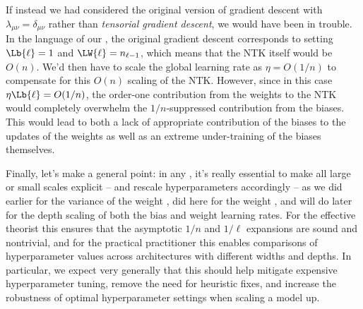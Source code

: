 If instead we 
had
considered the original version of gradient descent with $\lambda_{\mu\nu} = \delta_{\mu\nu}$ rather than \emph{tensorial gradient descent}, 
we would have been in trouble. In the language of our , the original gradient descent corresponds to setting $\Lb{\ell}=1$ and $\LW{\ell}=n_{\ell-1}$, which means that the NTK itself would be $O(n)$. We'd then have to scale the global learning rate as $\eta=O(1/n)$ %
to compensate for this $O(n)$ scaling of the NTK. However, since in this case $\eta\Lb{\ell}=O(1/n)$, the order-one contribution from the weights to the NTK would completely overwhelm the %
$1/n$-suppressed contribution from the biases. This would lead to both a lack of appropriate contribution of the biases to the updates of the %
weights
 as well as an extreme under-training of the biases themselves. 


Finally,
let's make 
a general point: in any ,
it's really essential to make all large or small scales explicit -- and rescale hyperparameters accordingly -- as we did earlier for the variance of the weight , did here for the weight , and will do later for the depth scaling of both the bias and weight learning rates.
For the effective theorist this ensures that the asymptotic $1/n$ and $1/\ell$ expansions are sound and nontrivial,
and for the practical practitioner this enables comparisons of hyperparameter values across architectures with different widths and depths. In particular, we expect very generally that this should help mitigate expensive hyperparameter tuning, remove the need for heuristic fixes, and increase the robustness of optimal hyperparameter settings when scaling a model up. %

